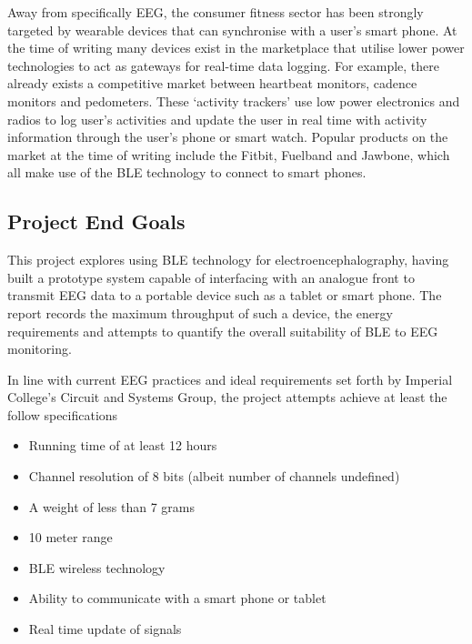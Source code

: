 \documentclass[]{article}
\begin{document}
Away from specifically \ac{EEG}, the consumer fitness sector has been strongly targeted by wearable devices that can synchronise with a user's smart phone. At the time of writing many devices exist in the marketplace that utilise lower power technologies to act as gateways for real-time data logging. For example, there already exists a competitive market between heartbeat monitors, cadence monitors and pedometers. These ‘activity trackers’ use low power electronics and radios to log user's activities and update the user in real time with activity information through the user's phone or smart watch. Popular products on the market at the time of writing include the Fitbit, Fuelband and Jawbone, which all make use of the \ac{BLE} technology to connect to smart phones.

\subsection{Project End Goals}

 This project explores using \ac{BLE} technology for electroencephalography, having built a prototype system capable of interfacing with an analogue front to transmit \ac{EEG} data to a portable device such as a tablet or smart phone.  The report records the maximum throughput of such a device, the energy requirements and attempts to quantify the overall suitability of \ac{BLE} to \ac{EEG} monitoring.

In line with current \ac{EEG} practices and ideal requirements set forth by Imperial College's Circuit and Systems Group, the project attempts achieve at least the follow specifications
\begin{itemize}
	\item Running time of at least 12 hours
	\item Channel resolution of 8 bits (albeit number of channels undefined)
	\item A weight of less than 7 grams
	\item 10 meter range
	\item BLE wireless technology
	\item Ability to communicate with a smart phone or tablet
	\item Real time update of signals
\end{itemize}
\end{document}
